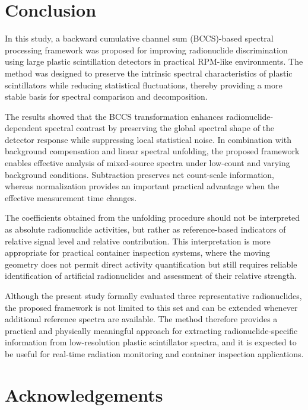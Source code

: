 \documentclass[10pt]{wlscirep}
\begin{document}
\normalcolor

\section*{Conclusion}

In this study, a backward cumulative channel sum (BCCS)-based spectral processing framework was proposed for improving radionuclide discrimination using large plastic scintillation detectors in practical RPM-like environments. The method was designed to preserve the intrinsic spectral characteristics of plastic scintillators while reducing statistical fluctuations, thereby providing a more stable basis for spectral comparison and decomposition.

The results showed that the BCCS transformation enhances radionuclide-dependent spectral contrast by preserving the global spectral shape of the detector response while suppressing local statistical noise. In combination with background compensation and linear spectral unfolding, the proposed framework enables effective analysis of mixed-source spectra under low-count and varying background conditions. Subtraction preserves net count-scale information, whereas normalization provides an important practical advantage when the effective measurement time changes.

The coefficients obtained from the unfolding procedure should not be interpreted as absolute radionuclide activities, but rather as reference-based indicators of relative signal level and relative contribution. This interpretation is more appropriate for practical container inspection systems, where the moving geometry does not permit direct activity quantification but still requires reliable identification of artificial radionuclides and assessment of their relative strength. 

Although the present study formally evaluated three representative radionuclides, the proposed framework is not limited to this set and can be extended whenever additional reference spectra are available. The method therefore provides a practical and physically meaningful approach for extracting radionuclide-specific information from low-resolution plastic scintillator spectra, and it is expected to be useful for real-time radiation monitoring and container inspection applications.

\section*{Acknowledgements}
\end{document}
